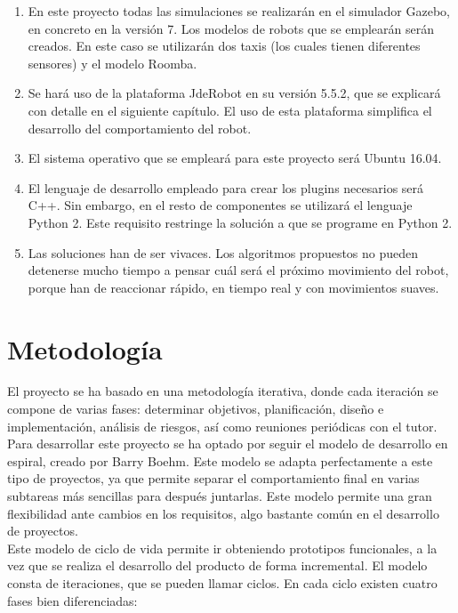 \begin{enumerate}[1.]
\item En este proyecto todas las simulaciones se realizarán en el simulador Gazebo, en concreto en la versión 7. Los modelos de robots que se emplearán serán creados. En este caso se utilizarán dos taxis (los cuales tienen diferentes sensores) y el modelo Roomba.
\item Se hará uso de la plataforma JdeRobot en su versión 5.5.2, que se explicará con detalle en el siguiente capítulo. El uso de esta plataforma simplifica el desarrollo del comportamiento del robot. 
\item El sistema operativo que se empleará para este proyecto será Ubuntu 16.04.
\item El lenguaje de desarrollo empleado para crear los plugins necesarios será C++. Sin embargo, en el resto de componentes se utilizará el lenguaje Python 2. Este requisito restringe la solución a que se programe en Python 2.
\item Las soluciones han de ser vivaces. Los algoritmos propuestos no pueden detenerse mucho tiempo a pensar cuál será el próximo movimiento del robot, porque han de reaccionar rápido, en tiempo real y con movimientos suaves.
\end{enumerate}

\section{Metodología}
El proyecto se ha basado en una metodología iterativa, donde cada iteración se compone de varias fases: determinar objetivos, planificación, diseño e implementación, análisis de riesgos, así como reuniones periódicas con el tutor.\\

Para desarrollar este proyecto se ha optado por seguir el modelo de desarrollo en espiral, creado por Barry Boehm. Este modelo se adapta perfectamente a este tipo de proyectos, ya que permite separar el comportamiento final en varias subtareas más sencillas para después juntarlas. Este modelo permite una gran flexibilidad ante cambios en los requisitos, algo bastante común en el desarrollo de proyectos.\\

Este modelo de ciclo de vida permite ir obteniendo prototipos funcionales, a la vez que se realiza el desarrollo del producto de forma incremental. El modelo consta de iteraciones, que se pueden llamar ciclos. En cada ciclo existen cuatro fases bien diferenciadas:

